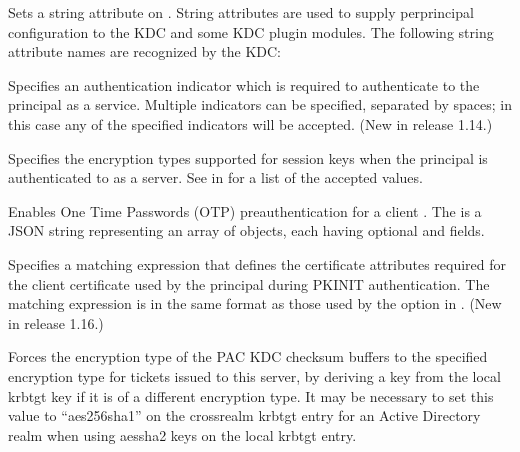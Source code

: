 \documentclass[letterpaper,10pt,english]{sphinxmanual}
\begin{document}
\sphinxAtStartPar
Sets a string attribute on .  String attributes are used to
supply per\sphinxhyphen{}principal configuration to the KDC and some KDC plugin
modules.  The following string attribute names are recognized by the
KDC:
\begin{description}
\sphinxAtStartPar
Specifies an authentication indicator which is required to
authenticate to the principal as a service.  Multiple indicators
can be specified, separated by spaces; in this case any of the
specified indicators will be accepted.  (New in release 1.14.)

\sphinxAtStartPar
Specifies the encryption types supported for session keys when the
principal is authenticated to as a server.  See
{\hyperref[\detokenize{admin/conf_files/kdc_conf:encryption-types}]{}} in {\hyperref[\detokenize{admin/conf_files/kdc_conf:kdc-conf-5}]{}} for a list of the
accepted values.

\sphinxAtStartPar
Enables One Time Passwords (OTP) preauthentication for a client
.  The  is a JSON string representing an array
of objects, each having optional  and  fields.

\sphinxAtStartPar
Specifies a matching expression that defines the certificate
attributes required for the client certificate used by the
principal during PKINIT authentication.  The matching expression
is in the same format as those used by the 
option in {\hyperref[\detokenize{admin/conf_files/krb5_conf:krb5-conf-5}]{}}.  (New in release 1.16.)

\sphinxAtStartPar
Forces the encryption type of the PAC KDC checksum buffers to the
specified encryption type for tickets issued to this server, by
deriving a key from the local krbtgt key if it is of a different
encryption type.  It may be necessary to set this value to
“aes256\sphinxhyphen{}sha1” on the cross\sphinxhyphen{}realm krbtgt entry for an Active
Directory realm when using aes\sphinxhyphen{}sha2 keys on the local krbtgt
entry.

\end{description}
\end{document}
